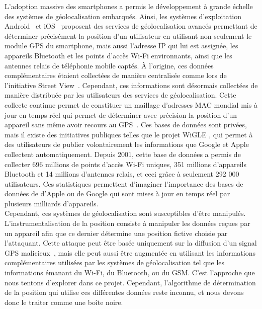 \documentclass[runningheads]{llncs}
\begin{document}
L'adoption massive des smartphones a permis le développement à grande échelle des systèmes de géolocalisation embarqués. Ainsi, les systèmes d'exploitation Android~\cite{google_how_2020} et iOS~\cite{apple_location_2020} proposent des services de géolocalisation avancés permettant de déterminer précisément la position d'un utilisateur en utilisant non seulement le module GPS du smartphone, mais aussi l'adresse IP qui lui est assignée, les appareils Bluetooth et les points d'accès Wi-Fi environnants, ainsi que les antennes relais de téléphonie mobile captés. À l'origine, ces données complémentaires étaient collectées de manière centralisée comme lors de l'initiative Street View~\cite{peter_fleischer_data_2010}. 
Cependant, ces informations sont désormais collectées de manière distribuée par les utilisateurs des services de géolocalisation. Cette collecte continue permet de constituer un maillage d'adresses MAC mondial mis à jour en temps réel qui permet de déterminer avec précision la position d'un appareil sans même avoir recours au GPS~\cite{google_overview_2020}.
Ces bases de données sont privées, mais il existe des initiatives publiques telles que le projet WiGLE \cite{bobzilla_wigle_2020}, qui permet à des utilisateurs de publier volontairement les informations que Google et Apple collectent automatiquement. Depuis 2001, cette base de données a permis de collecter 696 millions de points d'accès Wi-Fi uniques, 351 millions d'appareils Bluetooth et 14 millions d'antennes relais, et ceci grâce à seulement 292 000 utilisateurs. Ces statistiques permettent d'imaginer l'importance des bases de données de d'Apple ou de Google qui sont mises à jour en temps réel par plusieurs milliards d'appareils.~\cite{google_google_2019} \\

Cependant, ces systèmes de géolocalisation sont susceptibles d'être manipulés. L'instrumentalisation de la position consiste à manipuler les données reçues par un appareil afin que ce dernier détermine une position fictive choisie par l'attaquant. Cette attaque peut être basée uniquement sur la diffusion d'un signal GPS malicieux~\cite{huang_low-cost_2015}\cite{liu_all_2018}, mais elle peut aussi être augmentée en utilisant les informations complémentaires utilisées par les systèmes de géolocalisation tel que les informations émanant du Wi-Fi, du Bluetooth, ou du GSM. C'est l'approche que nous tentons d'explorer dans ce projet. Cependant, l'algorithme de détermination de la position qui utilise ces différentes données reste inconnu, et nous devons donc le traiter comme une boîte noire.\\
\end{document}

